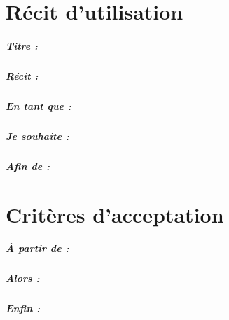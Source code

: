 \documentclass[12pt,a5paper, notitle, oneside]{report}
\begin{document}
    \chapter*{Récit d'utilisation}

    \paragraph{Titre : } %
    \paragraph{Récit : } %
    \paragraph{En tant que : } %
    \paragraph{Je souhaite : } %
    \paragraph{Afin de : } %
    \newpage

    \chapter*{Critères d'acceptation}

    \paragraph{À partir de : } %
    \paragraph{Alors : } %
    \paragraph{Enfin : } %
\end{document}

